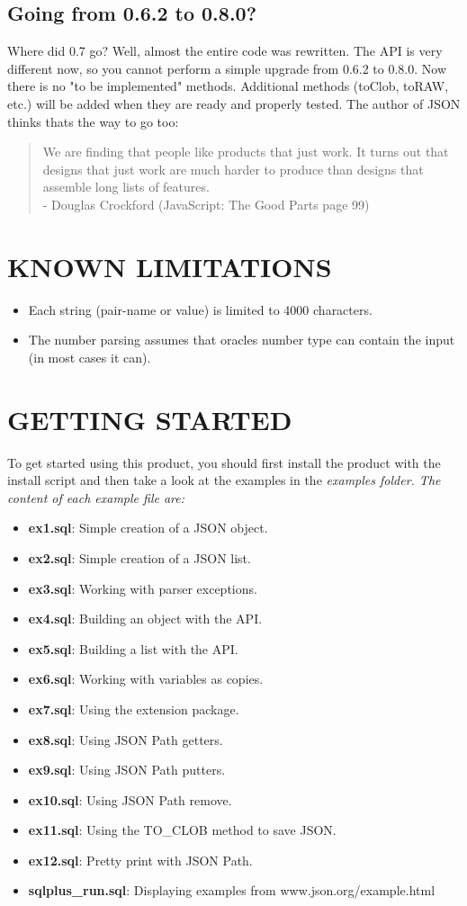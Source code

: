 \documentclass[11pt,twocolumn, a4paper]{article}
\begin{document}
\subsection*{Going from 0.6.2 to 0.8.0?}
Where did 0.7 go? Well, almost the entire code was rewritten. The API is very different now, so you cannot perform a simple upgrade from 0.6.2 to 0.8.0. Now there is no "to be implemented" methods. Additional methods (toClob, toRAW, etc.) will be added when they are ready and properly tested. The author of JSON thinks thats the way to go too: 
\begin{quotation}
We are finding that people like products that just work. It turns out that designs that just work are much harder to produce than designs that assemble long lists of features.\\ - Douglas Crockford (JavaScript: The Good Parts page 99)
\end{quotation}

\section*{KNOWN LIMITATIONS}
\begin{itemize}
\item Each string (pair-name or value) is limited to 4000 characters.
\item The number parsing assumes that oracles number type can contain the input (in most cases it can).
\end {itemize}

\section*{GETTING STARTED}
To get started using this product, you should first install the product with the install script and then take a look at the examples in the \em examples \em folder. The content of each example file are:
\begin{itemize}
\item \textbf{ex1.sql}: Simple creation of a JSON object. 
\item \textbf{ex2.sql}: Simple creation of a JSON list. 
\item \textbf{ex3.sql}: Working with parser exceptions.
\item \textbf{ex4.sql}: Building an object with the API.
\item \textbf{ex5.sql}: Building a list with the API.
\item \textbf{ex6.sql}: Working with variables as copies.
\item \textbf{ex7.sql}: Using the extension package.
\item \textbf{ex8.sql}: Using JSON Path getters.
\item \textbf{ex9.sql}: Using JSON Path putters.
\item \textbf{ex10.sql}: Using JSON Path remove.
\item \textbf{ex11.sql}: Using the TO\_CLOB method to save JSON.
\item \textbf{ex12.sql}: Pretty print with JSON Path.
\item \textbf{sqlplus\_run.sql}: Displaying examples from www.json.org/example.html
\end{itemize}
\end{document}
